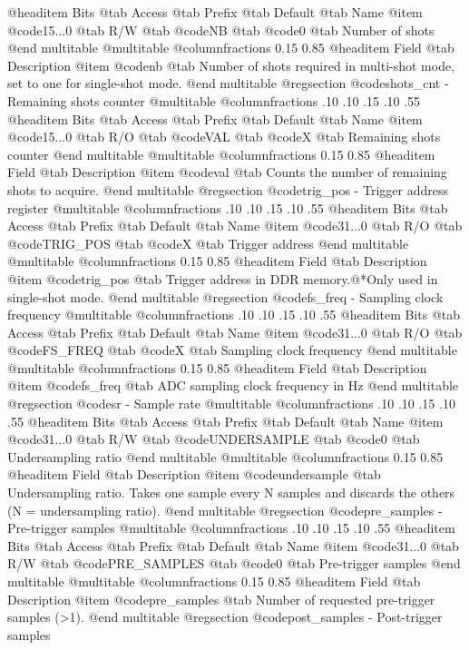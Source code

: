 @headitem Bits @tab Access @tab Prefix @tab Default @tab Name
@item @code{15...0}
@tab R/W @tab
@code{NB}
@tab @code{0} @tab 
Number of shots
@end multitable
@multitable @columnfractions 0.15 0.85
@headitem Field @tab Description
@item @code{nb} @tab Number of shots required in multi-shot mode, set to one for single-shot mode.
@end multitable
@regsection @code{shots_cnt} - Remaining shots counter
@multitable @columnfractions .10 .10 .15 .10 .55
@headitem Bits @tab Access @tab Prefix @tab Default @tab Name
@item @code{15...0}
@tab R/O @tab
@code{VAL}
@tab @code{X} @tab 
Remaining shots counter
@end multitable
@multitable @columnfractions 0.15 0.85
@headitem Field @tab Description
@item @code{val} @tab Counts the number of remaining shots to acquire.
@end multitable
@regsection @code{trig_pos} - Trigger address register
@multitable @columnfractions .10 .10 .15 .10 .55
@headitem Bits @tab Access @tab Prefix @tab Default @tab Name
@item @code{31...0}
@tab R/O @tab
@code{TRIG_POS}
@tab @code{X} @tab 
Trigger address
@end multitable
@multitable @columnfractions 0.15 0.85
@headitem Field @tab Description
@item @code{trig_pos} @tab Trigger address in DDR memory.@*Only used in single-shot mode.
@end multitable
@regsection @code{fs_freq} - Sampling clock frequency
@multitable @columnfractions .10 .10 .15 .10 .55
@headitem Bits @tab Access @tab Prefix @tab Default @tab Name
@item @code{31...0}
@tab R/O @tab
@code{FS_FREQ}
@tab @code{X} @tab 
Sampling clock frequency
@end multitable
@multitable @columnfractions 0.15 0.85
@headitem Field @tab Description
@item @code{fs_freq} @tab ADC sampling clock frequency in Hz
@end multitable
@regsection @code{sr} - Sample rate
@multitable @columnfractions .10 .10 .15 .10 .55
@headitem Bits @tab Access @tab Prefix @tab Default @tab Name
@item @code{31...0}
@tab R/W @tab
@code{UNDERSAMPLE}
@tab @code{0} @tab 
Undersampling ratio
@end multitable
@multitable @columnfractions 0.15 0.85
@headitem Field @tab Description
@item @code{undersample} @tab Undersampling ratio. Takes one sample every N samples and discards the others (N = undersampling ratio).
@end multitable
@regsection @code{pre_samples} - Pre-trigger samples
@multitable @columnfractions .10 .10 .15 .10 .55
@headitem Bits @tab Access @tab Prefix @tab Default @tab Name
@item @code{31...0}
@tab R/W @tab
@code{PRE_SAMPLES}
@tab @code{0} @tab 
Pre-trigger samples
@end multitable
@multitable @columnfractions 0.15 0.85
@headitem Field @tab Description
@item @code{pre_samples} @tab Number of requested pre-trigger samples (>1).
@end multitable
@regsection @code{post_samples} - Post-trigger samples
